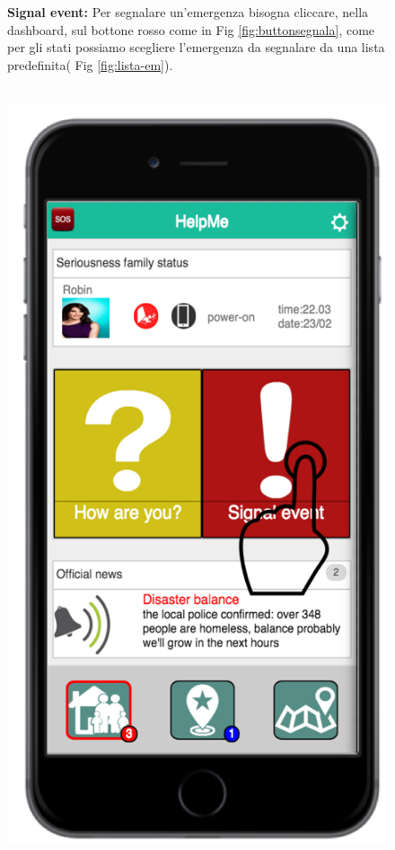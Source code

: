 \newpage


 \begin{figure}
  \textbf{Signal event:} Per segnalare un'emergenza bisogna cliccare, nella dashboard, sul bottone rosso come in Fig \ref{fig:buttonsegnala}, come per gli stati possiamo scegliere l'emergenza da segnalare da una lista predefinita( Fig \ref{fig:lista-em}).
 \\ \\
 \begin{minipage}[b]{6cm}
   \centering
 \includegraphics[scale=0.9]{interfaccia/tapbuttonsegnala.png}

\end{minipage}
\end{figure}
